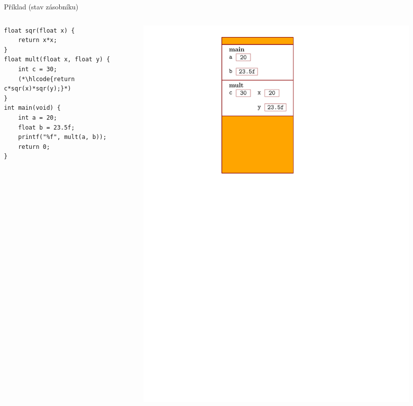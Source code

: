 \documentclass[14pt,aspectratio=169]{beamer}
\begin{document}
    \begin{frame}[t,fragile]{Příklad (stav zásobníku)}
        \begin{columns}[onlytextwidth]
            \begin{column}{0.55\textwidth}
                \begin{lstlisting}
float sqr(float x) {
    return x*x;
}
float mult(float x, float y) {
    int c = 30;
    (*\hlcode{return c*sqr(x)*sqr(y);}*)
}
int main(void) {
    int a = 20;
    float b = 23.5f;
    printf("%f", mult(a, b));
    return 0;
}
                \end{lstlisting}
            \end{column}
            \begin{column}{0.4\textwidth}
                \begin{figure}
                    \centering
                    \includegraphics[scale=.6]{images/zasobnik_stav_10.pdf}
                \end{figure}
            \end{column}
        \end{columns}
    \end{frame}
\end{document}
